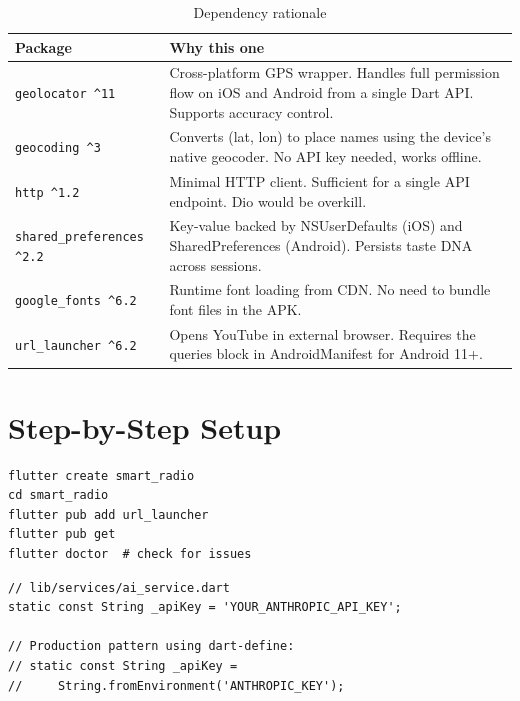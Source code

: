 \documentclass[12pt, a4paper]{report}
\newcommand{\pkg}[1]{\texttt{\color{codeblue}#1}}
\begin{document}
\begin{table}[H]
\centering
\renewcommand{\arraystretch}{1.5}
\begin{tabularx}{\linewidth}{@{}l X@{}}
  \toprule
  \rowcolor{codebg}
  \textbf{\color{cyancol}Package} & \textbf{\color{cyancol}Why this one} \\
  \midrule
  \pkg{geolocator \^{}11} &
    Cross-platform GPS wrapper. Handles full permission flow on iOS and
    Android from a single Dart API. Supports accuracy control. \\
  \pkg{geocoding \^{}3} &
    Converts (lat, lon) to place names using the device's native geocoder.
    No API key needed, works offline. \\
  \pkg{http \^{}1.2} &
    Minimal HTTP client. Sufficient for a single API endpoint.
    Dio would be overkill. \\
  \pkg{shared\_preferences \^{}2.2} &
    Key-value backed by NSUserDefaults (iOS) and SharedPreferences (Android).
    Persists taste DNA across sessions. \\
  \pkg{google\_fonts \^{}6.2} &
    Runtime font loading from CDN. No need to bundle font files in the APK. \\
  \pkg{url\_launcher \^{}6.2} &
    Opens YouTube in external browser. Requires the queries block in
    AndroidManifest for Android 11+. \\
  \bottomrule
\end{tabularx}
\caption{Dependency rationale}
\end{table}

\section{Step-by-Step Setup}

\begin{tcolorbox}[cyanbox, title=Step 1 --- Create and Install]
\begin{lstlisting}[style=bashcode, numbers=none]
flutter create smart_radio
cd smart_radio
flutter pub add url_launcher
flutter pub get
flutter doctor  # check for issues
\end{lstlisting}
\end{tcolorbox}

\begin{tcolorbox}[cyanbox, title=Step 2 --- Add API Key]
\begin{lstlisting}[style=dartcode]
// lib/services/ai_service.dart
static const String _apiKey = 'YOUR_ANTHROPIC_API_KEY';

// Production pattern using dart-define:
// static const String _apiKey =
//     String.fromEnvironment('ANTHROPIC_KEY');
\end{lstlisting}
\end{tcolorbox}
\end{document}

